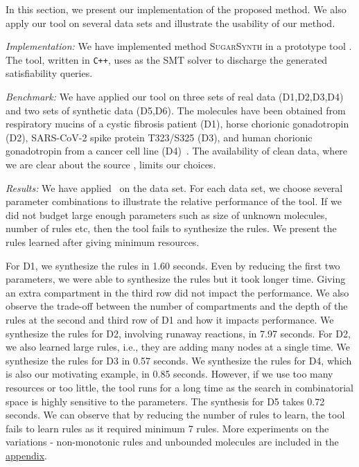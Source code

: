 In this section, we  present our implementation of the proposed method.
%
We also apply our tool on several data sets and illustrate the usability of our method.

{\em Implementation:} 
We have implemented method \textsc{SugarSynth} in a prototype tool {\ourtool}.
%
The tool, written in {\tt C++}, uses {\zthree}\cite{z3} as the SMT solver
to discharge the generated satisfiability queries.
%


{\em Benchmark: }
We have applied our tool on three sets of real data (D1,D2,D3,D4) and two sets of synthetic data (D5,D6). The molecules have been obtained from
respiratory mucins of a cystic fibrosis patient (D1),
horse chorionic gonadotropin (D2), SARS-CoV-2 spike protein T323/S325 (D3), and human chorionic gonadotropin from a cancer cell line (D4)~\cite{Jaiman2018,10.1093/glycob/cwaa042}.
The availability of clean data, where we are clear about the source
, limits our choices.

% 



{\em Results:}
We have applied \ourtool~on the data set. For each data set, we choose several
parameter combinations to illustrate the relative performance of the tool.
If we did not budget large enough parameters such as size of unknown molecules, number of rules etc, then the tool fails to
synthesize the rules.
We present the rules learned after giving minimum resources.

For D1, we synthesize the rules in 1.60 seconds. Even by reducing the first two parameters, we were able to synthesize the rules but it took longer time.
Giving an extra compartment in the third row did not impact the performance.  We also observe the trade-off between the number of compartments
and the depth of the rules at the second and third row of D1 and how it impacts performance.
We synthesize the rules for D2, involving runaway reactions,  in 7.97 seconds.
For D2, we also learned large rules, i.e., they are adding many nodes at a single time.
We synthesize the rules for D3 in 0.57 seconds. We synthesize the rules for D4, which is also our motivating example, in 0.85 seconds.
However, if we use too many resources or too little, the tool runs for a long time as the search in combinatorial space is highly sensitive to the parameters.
The synthesis for D5 takes 0.72 seconds. We can observe that by reducing the number of rules to learn, the tool fails to learn rules as it required minimum 7 rules. More experiments on the variations - non-monotonic rules and unbounded molecules are included in the \hyperref[sec:appendix]{appendix}.

